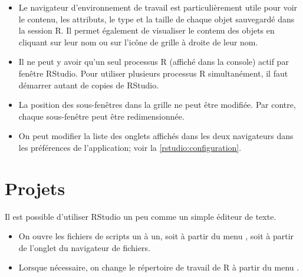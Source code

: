 \begin{itemize}
\item Le navigateur d'environnement de travail est particulièrement
  utile pour voir le contenu, les attributs, le type et la taille de
  chaque objet sauvegardé dans la session R. Il permet également de
  visualiser le contenu des objets en cliquant sur leur nom ou sur
  l'icône de grille à droite de leur nom.
\item Il ne peut y avoir qu'un seul processus R (affiché dans la
  console) actif par fenêtre RStudio. Pour utiliser plusieurs
  processus R simultanément, il faut démarrer autant de copies de
  RStudio.
\item La position des sous-fenêtres dans la grille ne peut être
  modifiée. Par contre, chaque sous-fenêtre peut être redimensionnée.
\item On peut modifier la liste des onglets affichés dans les deux
  navigateurs dans les préférences de l'application; voir la
  \autoref{rstudio:configuration}.
\end{itemize}


\section{Projets}
\label{rstudio:projets}

Il est possible d'utiliser RStudio un peu comme un simple éditeur de
texte.
\begin{itemize}
\item On ouvre les fichiers de scripts un à un, soit à partir du menu
  , soit à partir de l'onglet  du
  navigateur de fichiers.
\item Lorsque nécessaire, on change le répertoire de travail de R à
  partir du menu .
\end{itemize}

